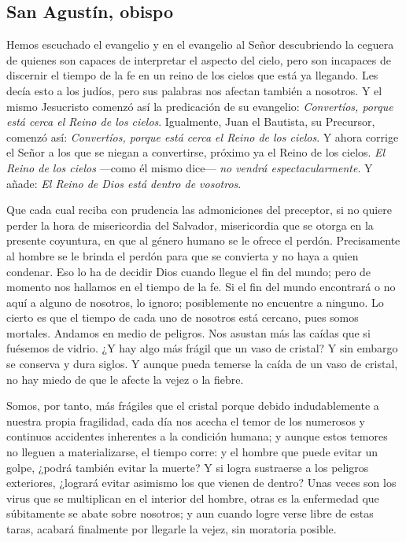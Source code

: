 		\subsection{San Agustín, obispo}


			
			\begin{body}
				Hemos escuchado el evangelio y en el evangelio al Señor descubriendo la ceguera de quienes son capaces de interpretar el aspecto del cielo, pero son incapaces de discernir el tiempo de la fe en un reino de los cielos que está ya llegando. Les decía esto a los judíos, pero sus palabras nos afectan también a nosotros. Y el mismo Jesucristo comenzó así la predicación de su evangelio: \emph{Convertíos, porque está cerca el Reino de los cielos}. Igualmente, Juan el Bautista, su Precursor, comenzó así: \emph{Convertíos, porque está cerca el Reino de los cielos}. Y ahora corrige el Señor a los que se niegan a convertirse, próximo ya el Reino de los cielos. \emph{El Reino de los cielos} ---como él mismo dice--- \emph{no vendrá espectacularmente}. Y añade: \emph{El Reino de Dios está dentro de vosotros}. 
				
				Que cada cual reciba con prudencia las admoniciones del preceptor, si no quiere perder la hora de misericordia del Salvador, misericordia que se otorga en la presente coyuntura, en que al género humano se le ofrece el perdón. Precisamente al hombre se le brinda el perdón para que se convierta y no haya a quien condenar. Eso lo ha de decidir Dios cuando llegue el fin del mundo; pero de momento nos hallamos en el tiempo de la fe. Si el fin del mundo encontrará o no aquí a alguno de nosotros, lo ignoro; posiblemente no encuentre a ninguno. Lo cierto es que el tiempo de cada uno de nosotros está cercano, pues somos mortales. Andamos en medio de peligros. Nos asustan más las caídas que si fuésemos de vidrio. ¿Y hay algo más frágil que un vaso de cristal? Y sin embargo se conserva y dura siglos. Y aunque pueda temerse la caída de un vaso de cristal, no hay miedo de que le afecte la vejez o la fiebre. 
				
				Somos, por tanto, más frágiles que el cristal porque debido indudablemente a nuestra propia fragilidad, cada día nos acecha el temor de los numerosos y continuos accidentes inherentes a la condición humana; y aunque estos temores no lleguen a materializarse, el tiempo corre: y el hombre que puede evitar un golpe, ¿podrá también evitar la muerte? Y si logra sustraerse a los peligros exteriores, ¿logrará evitar asimismo los que vienen de dentro? Unas veces son los virus que se multiplican en el interior del hombre, otras es la enfermedad que súbitamente se abate sobre nosotros; y aun cuando logre verse libre de estas taras, acabará finalmente por llegarle la vejez, sin moratoria posible.
			\end{body}

